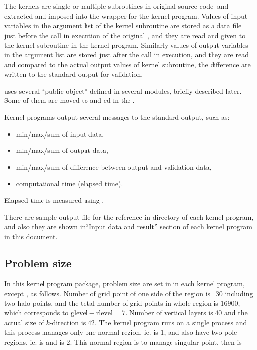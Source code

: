 The kernels are single or multiple subroutines in original \NICAM source code,
and extracted and imposed into the wrapper for the kernel program.
%
Values of input variables in the argument list of the kernel subroutine
are stored as a data file just before the call in execution of the original \NICAM, and
they are read and given to the kernel subroutine in the kernel program.
%
Similarly values of output variables in the argument list are stored
just after the call in execution, and they are read and compared to the
actual output values of kernel subroutine, the difference are written to
the standard output for validation.

\NICAM uses several ``public object'' defined in several modules,
briefly described later.
%
Some of them are moved to  and ed in
the .



Kernel programs output several messages to the standard output, such as:
\begin{itemize}
 \item min/max/sum of input data,
 \item min/max/sum of output data,
 \item min/max/sum of difference between output and validation data,
 \item computational time (elapsed time).
\end{itemize}
%
Elapsed time is measured using .

There are sample output file for the reference in  directory
of each kernel program, and also they are shown in``Input data and
result'' section of each kernel program in this document.

\subsection{Problem size}

In this kernel program package, problem size are set in
 in each kernel program, except
, as follows.
%
Number of grid point of one side of the region  is
$130$ including two halo points, and the total number of grid points in
whole region  is $16900$, which corresponds to
$\text{glevel}-\text{rlevel}=7$.
%
Number of vertical layers  is $40$ and the actual size
of $k$-direction  is $42$.
%
The kernel program runs on a single process and this process manages
only one normal region, ie.  is $1$, and also have two
pole regions, ie.  is  and
 is $2$.
%
This normal region is to manage singular point, then
 is 


